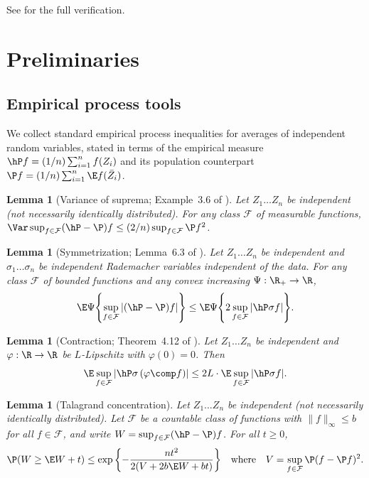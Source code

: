 \documentclass{article}
\newif\ifarXiv
\newcommand{\F}{\mathcal{F}}
\newtheorem{lemma}[theorem]{Lemma}
\begin{document}
See 
for the full verification.

\ifarXiv
  \printbibliography
\else
  
  
\fi


\appendix

\section{Preliminaries}
\label{sec:general-framework}

\subsection{Empirical process tools}
\label{sec:empirical-process-tools}

We collect standard empirical process inequalities
for averages of independent random variables,
stated in terms of the empirical measure
$\hP f = (1/n)\sum_{i=1}^n f(Z_i)$
and its population counterpart
$\P f = (1/n)\sum_{i=1}^n \E f(\bar Z_i)$.

\begin{lemma}[Variance of suprema; Example~3.6 of \citealt{boucheron2013concentration}]
\label{lem:efron-stein}
Let $Z_1 \ldots Z_n$ be independent
(not necessarily identically distributed).
For any class $\F$
of measurable functions,
$\Var \sup_{f \in \F} (\hP - \P) f
  \le (2/n) \sup_{f \in \F} \P f^2$.
\end{lemma}

\begin{lemma}[Symmetrization; Lemma~6.3 of \citealt{ledoux2013probability}]
\label{lem:symmetrization}
Let $Z_1 \ldots Z_n$ be independent
and $\sigma_1 \ldots \sigma_n$ be independent Rademacher
variables independent of the data.
For any class $\F$
of bounded functions
and any convex increasing $\Psi : \R_+ \to \R$,
\[
\E \Psi\qty{\sup_{f \in \F} |(\hP - \P) f|}
  \le \E \Psi\qty{
    2 \sup_{f \in \F}
    \qty|\hP \sigma f|}.
\]
\end{lemma}

\begin{lemma}[Contraction; Theorem~4.12 of \citealt{ledoux2013probability}]
\label{lem:contraction}
Let $Z_1 \ldots Z_n$ be independent
and $\varphi : \R \to \R$ be $L$-Lipschitz
with $\varphi(0) = 0$.
Then
\[
\E \sup_{f \in \F}
  \qty|\hP \sigma\, (\varphi \comp f)|
\le 2L \cdot
  \E \sup_{f \in \F}
  \qty|\hP \sigma f|.
\]
\end{lemma}

\begin{lemma}[Talagrand concentration]
\label{lem:talagrand}
Let $Z_1 \ldots Z_n$ be independent (not necessarily identically distributed).
Let $\F$ be a countable class of functions
with $\|f\|_\infty \le b$ for all $f \in \F$,
and write $W = \sup_{f \in \F} (\hP - \P)f$.
For all $t \ge 0$,
\[
\P\qty(W \ge \E W + t)
  \le \exp\qty{-\frac{nt^2}{2(V + 2b\E W + bt)}}
\qqtext{where}
V = \sup_{f \in \F} \P(f - \P f)^2.
\]
\end{lemma}
\end{document}
